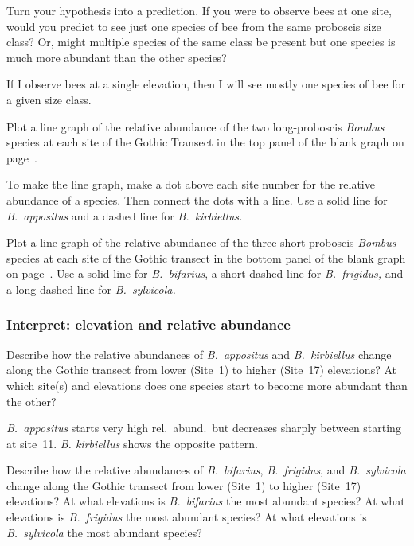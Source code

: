 \documentclass[12pt, hidelinks]{exam}
\newcommand*\AnswerBox[2]{%
    \parbox[t][#1]{0.92\textwidth}{%
    \begin{solution}#2\end{solution}}
    \vspace{\stretch{1}}
}
\begin{document}
\begin{questions}
\question
Turn your hypothesis into a prediction. If you were to observe bees at one site, would you predict
to see just one species of bee from the same proboscis size class? Or, might multiple
species of the same class be present but one species is much more abundant than the other species?

\AnswerBox{0.1\textheight}{If I observe bees at a single elevation, then 
I will see mostly one species of bee for a given size class.}


\question
Plot a line graph of the relative abundance of the two long-proboscis \textit{Bombus} species at each site of the Gothic Transect in the top panel of the blank graph on page~\pageref{fig:relative_abundance}. 

To make the line graph, make a dot above each site number
for the relative abundance of a species. Then connect the dots with a line. Use a solid line for \textit{B.~appositus} and a dashed 
line for \textit{B.~kirbiellus.}

\question
Plot a line graph of the relative abundance of the three 
short-proboscis \textit{Bombus} species at each site of the Gothic 
transect in the bottom panel of the blank graph on 
page~\pageref{fig:relative_abundance}. Use a solid line for 
\textit{B.~bifarius}, a short-dashed line for \textit{B.~frigidus,} 
and a long-dashed line for \textit{B.~sylvicola.}

\subsubsection*{Interpret: elevation and relative abundance}
\question
Describe how the relative abundances of \textit{B.~appositus} and 
\textit{B.~kirbiellus} change along the Gothic transect from
lower (Site~1) to higher (Site~17) elevations? At which site(s)
and elevations does one species start to become more abundant
than the other?

\AnswerBox{0.05\textheight}{\textit{B.~appositus} starts very 
high rel.~abund.~but decreases sharply between starting at
site~11. \textit{B. kirbiellus} shows the opposite pattern.}

\question
Describe how the relative abundances of \textit{B.~bifarius},
\textit{B.~frigidus}, and \textit{B.~sylvicola} change along 
the Gothic transect from lower (Site~1) to higher (Site~17) elevations? At what elevations is \textit{B.~bifarius} the
most abundant species? At what elevations is \textit{B.~frigidus} 
the most abundant species? At what elevations is \textit{B.~sylvicola} 
the most abundant species?


\end{questions}
\end{document}
